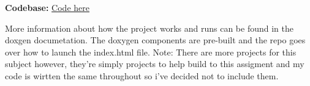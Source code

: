 \textbf{Codebase: } \href{https://github.com/jackfruittt/Terrain-Surveying-Drone}{Code here} \newline


More information about how the project works and runs can be found in the doxgen documetation. The doxygen components are pre-built and the repo goes over how to launch the index.html file.
Note: There are more projects for this subject however, they're simply projects to help build to this assigment and my code is wirtten the same throughout so i've decided not to include them.